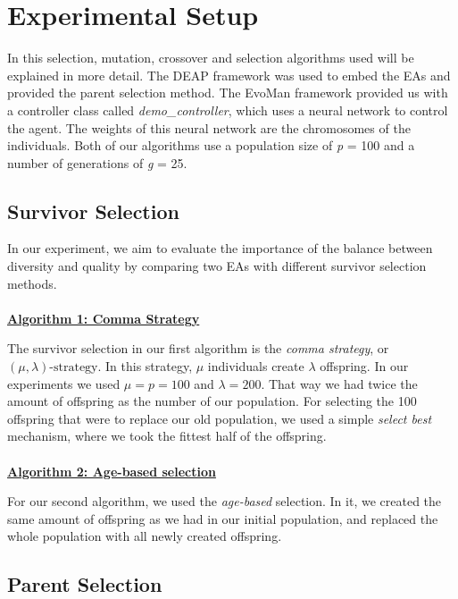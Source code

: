 \section{Experimental Setup}

In this selection, mutation, crossover and selection algorithms used will be explained in more detail. The DEAP framework \cite{DEAP_JMLR2012} was used to embed the EAs and provided the parent selection method. The EvoMan framework provided us with a controller class called \emph{demo\_controller}, which uses a neural network to control the agent. The weights of this neural network are the chromosomes of the individuals. Both of our algorithms use a population size of \textit{p }= 100 and a number of generations of \textit{g }= 25.

\subsection{Survivor Selection}
In our experiment, we aim to evaluate the importance of the balance between diversity and quality by comparing two EAs with different survivor selection methods.
\\\\
\noindent\textbf{\underline{Algorithm 1: Comma Strategy}}

The survivor selection in our first algorithm is the \emph{comma strategy}, or $\left(\mu,\lambda\right)\text{-strategy}$. In this strategy, $\mu$ individuals create $\lambda$ offspring. In our experiments we used $\mu = p = 100$ and $\lambda = 200$. That way we had twice the amount of offspring as the number of our population. For selecting the 100 offspring that were to replace our old population, we used a simple \emph{select best} mechanism, where we took the fittest half of the offspring.
\\\\
\noindent\textbf{\underline{Algorithm 2: Age-based selection}}

For our second algorithm, we used the \emph{age-based} selection. In it, we created the same amount of offspring as we had in our initial population, and replaced the whole population with all newly created offspring.

\subsection{Parent Selection}

